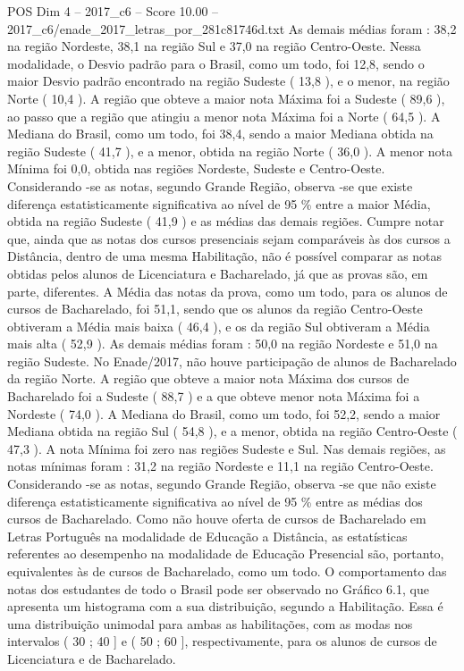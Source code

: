 \begin{textsample}{POS Dim 4 – 2017\_c6 – Score 10.00 – 2017\_c6/enade\_2017\_letras\_por\_281c81746d.txt}
As demais médias foram : 38,2 na região Nordeste, 38,1 na região Sul e 37,0 na região Centro-Oeste.
Nessa modalidade, o Desvio padrão para o Brasil, como um todo, foi 12,8, sendo o maior Desvio padrão encontrado na região Sudeste ( 13,8 ), e o menor, na região Norte ( 10,4 ).
A região que obteve a maior nota Máxima foi a Sudeste ( 89,6 ), ao passo que a região que atingiu a menor nota Máxima foi a Norte ( 64,5 ).
A Mediana do Brasil, como um todo, foi 38,4, sendo a maior Mediana obtida na região Sudeste ( 41,7 ), e a menor, obtida na região Norte ( 36,0 ).
A menor nota Mínima foi 0,0, obtida nas regiões Nordeste, Sudeste e Centro-Oeste.
Considerando -se as notas, segundo Grande Região, observa -se que existe diferença estatisticamente significativa ao nível de 95 \% entre a maior Média, obtida na região Sudeste ( 41,9 ) e as médias das demais regiões.
Cumpre notar que, ainda que as notas dos cursos presenciais sejam comparáveis às dos cursos a Distância, dentro de uma mesma Habilitação, não é possível comparar as notas obtidas pelos alunos de Licenciatura e Bacharelado, já que as provas são, em parte, diferentes.
A Média das notas da prova, como um todo, para os alunos de cursos de Bacharelado, foi 51,1, sendo que os alunos da região Centro-Oeste obtiveram a Média mais baixa ( 46,4 ), e os da região Sul obtiveram a Média mais alta ( 52,9 ).
As demais médias foram : 50,0 na região Nordeste e 51,0 na região Sudeste.
No Enade/2017, não houve participação de alunos de Bacharelado da região Norte.
A região que obteve a maior nota Máxima dos cursos de Bacharelado foi a Sudeste ( 88,7 ) e a que obteve menor nota Máxima foi a Nordeste ( 74,0 ).
A Mediana do Brasil, como um todo, foi 52,2, sendo a maior Mediana obtida na região Sul ( 54,8 ), e a menor, obtida na região Centro-Oeste ( 47,3 ).
A nota Mínima foi zero nas regiões Sudeste e Sul.
Nas demais regiões, as notas mínimas foram : 31,2 na região Nordeste e 11,1 na região Centro-Oeste.
Considerando -se as notas, segundo Grande Região, observa -se que não existe diferença estatisticamente significativa ao nível de 95 \% entre as médias dos cursos de Bacharelado.
Como não houve oferta de cursos de Bacharelado em Letras Português na modalidade de Educação a Distância, as estatísticas referentes ao desempenho na modalidade de Educação Presencial são, portanto, equivalentes às de cursos de Bacharelado, como um todo.
O comportamento das notas dos estudantes de todo o Brasil pode ser observado no Gráfico 6.1, que apresenta um histograma com a sua distribuição, segundo a Habilitação.
Essa é uma distribuição unimodal para ambas as habilitações, com as modas nos intervalos ( 30 ; 40 ] e ( 50 ; 60 ], respectivamente, para os alunos de cursos de Licenciatura e de Bacharelado.

\end{textsample}
